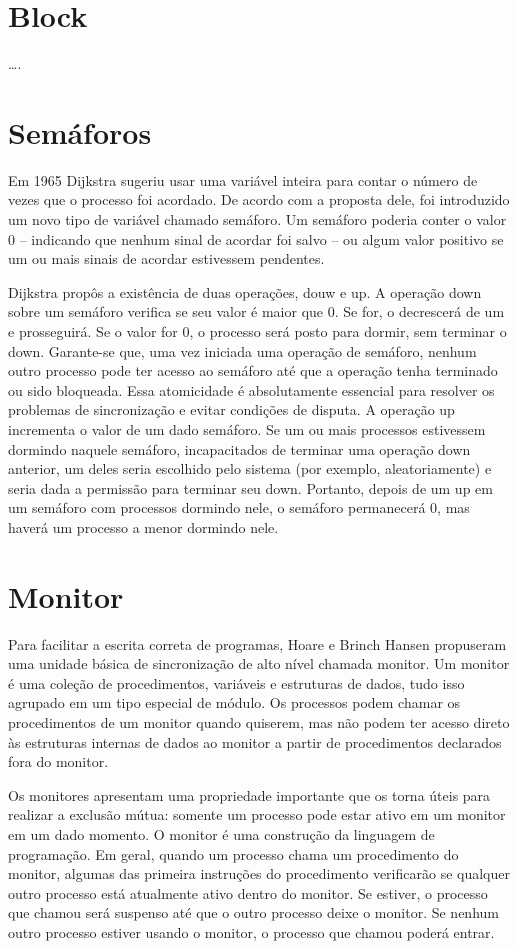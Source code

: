 \section{Block}
….


\section{Semáforos}

Em 1965 Dijkstra sugeriu usar uma variável inteira para contar o número de vezes que o 
processo foi acordado. De acordo com a proposta dele, foi introduzido um novo tipo de 
variável chamado semáforo. Um semáforo poderia conter o valor 0 – indicando que nenhum 
sinal de acordar foi salvo – ou algum valor positivo se um ou mais sinais de acordar 
estivessem pendentes.

Dijkstra propôs a existência de duas operações,  douw e up. A operação down sobre um semáforo verifica se seu valor é maior que 0. Se for, o decrescerá de um e prosseguirá. Se o valor for 0, o processo será posto para dormir, sem terminar o down. Garante-se que, uma vez iniciada uma operação de semáforo, nenhum outro processo pode ter acesso ao semáforo até que a operação tenha terminado ou sido bloqueada. Essa atomicidade é absolutamente essencial para resolver os problemas de sincronização e evitar condições de disputa.
A operação up incrementa o valor de um dado semáforo. Se um ou mais processos estivessem dormindo naquele semáforo, incapacitados de terminar uma operação down anterior, um deles seria escolhido pelo sistema (por exemplo, aleatoriamente) e seria dada a permissão para terminar seu down. Portanto, depois de um up em um semáforo com processos dormindo nele, o semáforo permanecerá 0, mas haverá um processo a menor dormindo nele.

\section{Monitor}

Para facilitar a escrita correta de programas, Hoare e Brinch Hansen propuseram uma unidade básica de sincronização de alto nível chamada monitor.  Um monitor é uma coleção de procedimentos, variáveis e estruturas de dados, tudo isso agrupado em um tipo especial de módulo. Os processos podem chamar os procedimentos de um monitor quando quiserem, mas não podem ter acesso direto às estruturas internas de dados ao monitor a partir de procedimentos declarados fora do monitor.

Os monitores apresentam uma propriedade importante que os torna úteis para realizar a exclusão mútua: somente um processo pode estar ativo em um monitor em um dado momento. O monitor é uma construção da linguagem de programação. Em geral, quando um processo chama um procedimento do monitor, algumas das primeira instruções do procedimento verificarão  se qualquer outro processo está atualmente ativo dentro do monitor. Se estiver, o processo que chamou será suspenso até que o outro processo deixe o monitor. Se nenhum outro processo estiver usando o monitor, o processo que chamou poderá entrar.

